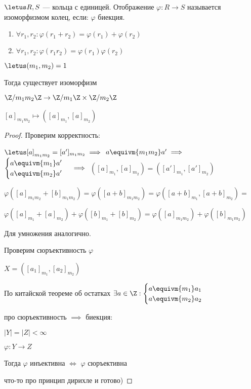 \begin{defn}
    $\letus R, S$ --- кольца с единицей. Отображение $\varphi: R \to S$ называется изоморфизмом колец, если: $\varphi$ биекция.
    
    \begin{enumerate}
        \item $\forall r_1, r_2: \varphi(r_1 + r_2) = \varphi(r_1) + \varphi(r_2)$
        
        \item $\forall r_1, r_2: \varphi(r_1 r_2) = \varphi(r_1) \varphi(r_2)$
    \end{enumerate}
\end{defn}

\begin{theorem-non}
    $\letus (m_1, m_2) = 1$ 

    Тогда существует изоморфизм 
    
    $\Z/m_1m_2\Z \to \Z/m_1\Z \times \Z/m_2\Z$
    
    $[a]_{m_1m_2} \mapsto ([a]_{m_1}, [a]_{m_2})$
\end{theorem-non}

\begin{proof}
    Проверим корректность:
    
    $\letus [a]_{m_1m_2} = [a']_{m_1m_2} \implies$
    $a \equivm{m_1m_2} a' \implies$
    $\begin{cases}
        a \equivm{m_1} a' \\
        a \equivm{m_2} a'
    \end{cases} \implies$
    $([a]_{m_1}, [a]_{m_2}) = ([a']_{m_1}, [a']_{m_2})$
    
    $\varphi([a]_{m_1m_2} + [b]_{m_1m_2}) = \varphi([a + b]_{m_1m_2}) = \varphi([a+b]_{m_1}, [a+b]_{m_2}) = $
    
    $\varphi([a]_{m_1} + [a]_{m_2}) + \varphi([b]_{m_1} + [b]_{m_2}) = \varphi([a]_{m_1m_2}) + \varphi([b]_{m_1m_2})$
    
    Для умножения аналогично.
    
    Проверим сюръективность $\varphi$
    
    $X = ([a_1]_{m_1}, [a_2]_{m_2})$
    
    По китайской теореме об остатках $\exists a \in \Z: 
    \begin{cases}
        a \equivm{m_1} a_1 \\
        a \equivm{m_2} a_2
    \end{cases}$

    про сюръективность $\implies$ биекция:
    
    $|Y| = |Z| < \infty$
    
    $\varphi: Y \to Z$
    
    Тогда $\varphi$ инъективна $\iff$ $\varphi$ сюръективна
    
    что-то про принцип дирихле и готово)
\end{proof}


